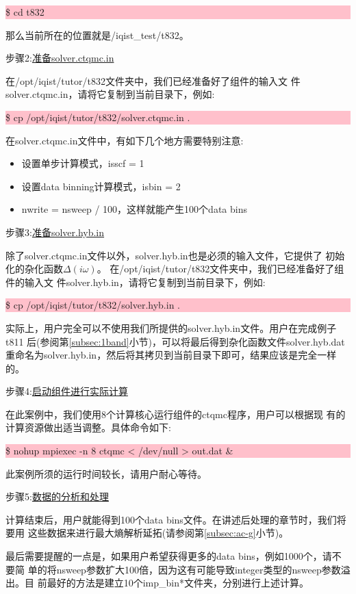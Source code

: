 \noindent\colorbox{pink}{\parbox[r]{\linewidth}{\quad \$ cd t832 }}

那么当前所在的位置就是/iqist\_test/t832。

步骤2:\underline{准备solver.ctqmc.in}

在/opt/iqist/tutor/t832文件夹中，我们已经准备好了{\azalea}组件的输入文
件solver.ctqmc.in，请将它复制到当前目录下，例如:

\noindent\colorbox{pink}{\parbox[r]{\linewidth}{\quad \$ cp /opt/iqist/tutor/t832/solver.ctqmc.in . }}

在solver.ctqmc.in文件中，有如下几个地方需要特别注意:

\begin{itemize}
  \item 设置单步计算模式，isscf = 1
  \item 设置data binning计算模式，isbin = 2
  \item nwrite = nsweep / 100，这样就能产生100个data bins
\end{itemize}

步骤3:\underline{准备solver.hyb.in}

除了solver.ctqmc.in文件以外，solver.hyb.in也是必须的输入文件，它提供了
初始化的杂化函数$\Delta(i\omega)$。
在/opt/iqist/tutor/t832文件夹中，我们已经准备好了{\azalea}组件的输入文
件solver.hyb.in，请将它复制到当前目录下，例如:

\noindent\colorbox{pink}{\parbox[r]{\linewidth}{\quad \$ cp /opt/iqist/tutor/t832/solver.hyb.in . }}

实际上，用户完全可以不使用我们所提供的solver.hyb.in文件。用户在完成例子t811
后(参阅第\ref{subsec:1band}小节)，可以将最后得到杂化函数文件solver.hyb.dat
重命名为solver.hyb.in，然后将其拷贝到当前目录下即可，结果应该是完全一样的。

步骤4:\underline{启动{\azalea}组件进行实际计算}

在此案例中，我们使用8个计算核心运行{\azalea}组件的ctqmc程序，用户可以根据现
有的计算资源做出适当调整。具体命令如下:

\noindent\colorbox{pink}{\parbox[r]{\linewidth}{\quad \$ nohup mpiexec -n 8 ctqmc < /dev/null >  out.dat \&}}
此案例所须的运行时间较长，请用户耐心等待。

步骤5:\underline{数据的分析和处理}

计算结束后，用户就能得到100个data bins文件。在讲述后处理的章节时，我们将要用
这些数据来进行最大熵解析延拓(请参阅第\ref{subsec:ac-g}小节)。

最后需要提醒的一点是，如果用户希望获得更多的data bins，例如1000个，请不要简
单的将nsweep参数扩大100倍，因为这有可能导致integer类型的nsweep参数溢出。目
前最好的方法是建立10个imp\_bin*文件夹，分别进行上述计算。

